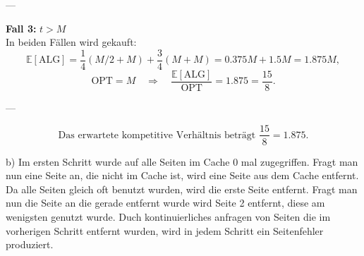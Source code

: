 \documentclass[a4paper]{scrartcl}
\begin{document}
---

\textbf{Fall 3:} \(t > M\) \\
In beiden Fällen wird gekauft:
\[
\mathbb{E}[\text{ALG}] =
\frac{1}{4}(M/2 + M) + \frac{3}{4}(M + M)
= 0.375M + 1.5M = 1.875M,
\]
\[
\text{OPT} = M \quad \Rightarrow \quad
\frac{\mathbb{E}[\text{ALG}]}{\text{OPT}} = 1.875 = \frac{15}{8}.
\]

---

\[
\boxed{
\text{Das erwartete kompetitive Verhältnis beträgt } \frac{15}{8} = 1.875.
}
\]

\bigskip
b) Im ersten Schritt wurde auf alle Seiten im Cache 0 mal zugegriffen. Fragt man nun eine Seite an, die nicht im Cache ist, 
wird eine Seite aus dem Cache entfernt. Da alle Seiten gleich oft benutzt wurden, wird die erste Seite entfernt. Fragt 
man nun die Seite an die gerade entfernt wurde wird Seite 2 entfernt, diese am wenigsten genutzt wurde.
Duch kontinuierliches anfragen von Seiten die im vorherigen Schritt entfernt wurden, wird in jedem
Schritt ein Seitenfehler produziert.



\end{document}

